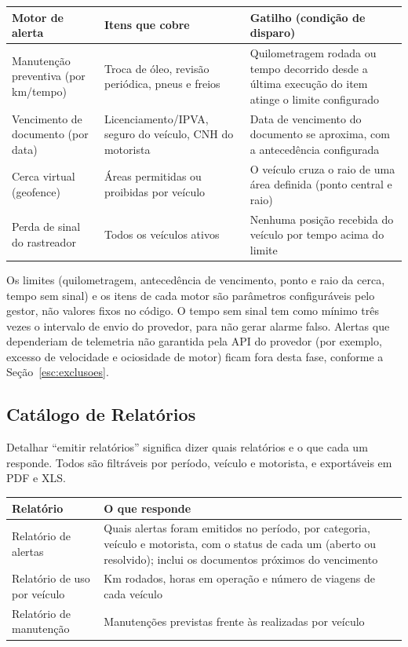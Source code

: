 \documentclass[11pt,a4paper]{article}
\begin{document}
\begin{center}
\begin{tabularx}{\textwidth}{L L L}
\toprule
\textbf{Motor de alerta} & \textbf{Itens que cobre} & \textbf{Gatilho (condição de disparo)} \\
\midrule
Manutenção preventiva (por km/tempo) & Troca de óleo, revisão periódica, pneus e freios & Quilometragem rodada ou tempo decorrido desde a última execução do item atinge o limite configurado \\
Vencimento de documento (por data) & Licenciamento/IPVA, seguro do veículo, CNH do motorista & Data de vencimento do documento se aproxima, com a antecedência configurada \\
Cerca virtual (geofence) & Áreas permitidas ou proibidas por veículo & O veículo cruza o raio de uma área definida (ponto central e raio) \\
Perda de sinal do rastreador & Todos os veículos ativos & Nenhuma posição recebida do veículo por tempo acima do limite \\
\bottomrule
\end{tabularx}
\end{center}

\noindent Os limites (quilometragem, antecedência de vencimento, ponto e raio da cerca, tempo sem sinal) e os itens de cada motor são parâmetros configuráveis pelo gestor, não valores fixos no código. O tempo sem sinal tem como mínimo três vezes o intervalo de envio do provedor, para não gerar alarme falso. Alertas que dependeriam de telemetria não garantida pela API do provedor (por exemplo, excesso de velocidade e ociosidade de motor) ficam fora desta fase, conforme a Seção~\ref{esc:exclusoes}.

\subsection{Catálogo de Relatórios}\label{esc:relatorios}
Detalhar ``emitir relatórios'' significa dizer quais relatórios e o que cada um responde. Todos são filtráveis por período, veículo e motorista, e exportáveis em PDF e XLS.

\begin{center}
\begin{tabularx}{\textwidth}{L L}
\toprule
\textbf{Relatório} & \textbf{O que responde} \\
\midrule
Relatório de alertas & Quais alertas foram emitidos no período, por categoria, veículo e motorista, com o status de cada um (aberto ou resolvido); inclui os documentos próximos do vencimento \\
Relatório de uso por veículo & Km rodados, horas em operação e número de viagens de cada veículo \\
Relatório de manutenção & Manutenções previstas frente às realizadas por veículo \\
\bottomrule
\end{tabularx}
\end{center}
\end{document}
